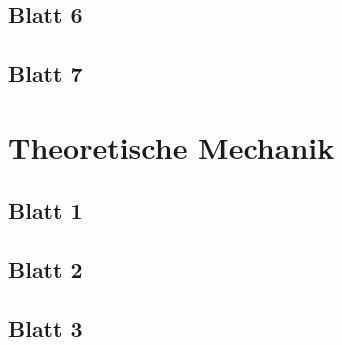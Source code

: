 \documentclass{tuftebook}
\numberwithin{Theorem}{chapter}
\theoremstyle{definition}
\theoremstyle{definition}
\begin{document}
\section{Blatt 6}

\section{Blatt 7}


\chapter{Theoretische Mechanik}
\section{Blatt 1}

\section{Blatt 2}

\section{Blatt 3}

\end{document}
